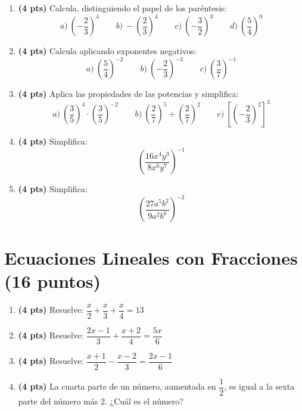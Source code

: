 \documentclass[12pt, letterpaper]{article}
\begin{document}
\begin{enumerate}[leftmargin=*]
  \item \textbf{(4 pts)} Calcula, distinguiendo el papel de los paréntesis:
        \[
          a)\ \left(-\frac{2}{3}\right)^4 \qquad b)\ -\left(\frac{2}{3}\right)^4 \qquad c)\ \left(-\frac{3}{2}\right)^3 \qquad d)\ \left(\frac{5}{4}\right)^0
        \]

  \item \textbf{(4 pts)} Calcula aplicando exponentes negativos:
        \[
          a)\ \left(\frac{5}{4}\right)^{-2} \qquad b)\ \left(-\frac{2}{3}\right)^{-3} \qquad c)\ \left(\frac{3}{7}\right)^{-1}
        \]

  \item \textbf{(4 pts)} Aplica las propiedades de las potencias y simplifica:
        \[
          a)\ \left(\frac{3}{5}\right)^4 \cdot \left(\frac{3}{5}\right)^{-2} \qquad
          b)\ \left(\frac{2}{7}\right)^5 \div \left(\frac{2}{7}\right)^2 \qquad
          c)\ \left[\left(-\frac{2}{3}\right)^2\right]^3
        \]

  \item \textbf{(4 pts)} Simplifica:
        \[
          \left(\frac{16x^4y^3}{8x^6y^7}\right)^{-1}
        \]

  \item \textbf{(4 pts)} Simplifica:
        \[
          \left(\frac{27a^5b^2}{9a^2b^6}\right)^{-2}
        \]
\end{enumerate}

\newpage

\section{Ecuaciones Lineales con Fracciones (16 puntos)}

\begin{enumerate}[leftmargin=*]
  \item \textbf{(4 pts)} Resuelve: $\dfrac{x}{2} + \dfrac{x}{3} + \dfrac{x}{4} = 13$

  \item \textbf{(4 pts)} Resuelve: $\dfrac{2x - 1}{3} + \dfrac{x + 2}{4} = \dfrac{5x}{6}$

  \item \textbf{(4 pts)} Resuelve: $\dfrac{x + 1}{2} - \dfrac{x - 2}{3} = \dfrac{2x - 1}{6}$

  \item \textbf{(4 pts)} La cuarta parte de un número, aumentada en $\dfrac{1}{2}$, es igual a la sexta parte del número más 2. ¿Cuál es el número?
\end{enumerate}
\end{document}
